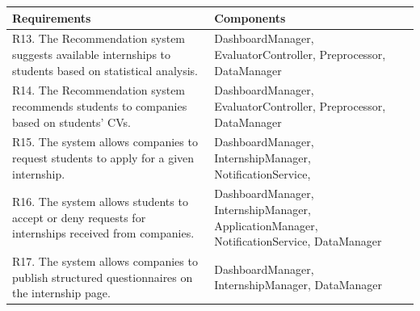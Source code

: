 \documentclass{article}
\begin{document}
\begin{table}[H]
    \centering
    \begin{tabular}{|p{}|p{}|}
        \hline
         \textbf{Requirements} & \textbf{Components} \\
         \hline
         R13. The Recommendation system suggests available internships to students
        based on statistical analysis.\newline
         &
        DashboardManager, \newline
        EvaluatorController,\newline
        Preprocessor,\newline
        DataManager\\

        \hline
         R14. The Recommendation system recommends students to companies
        based on students’ CVs.\newline
         &
        DashboardManager, \newline
        EvaluatorController,\newline
        Preprocessor,\newline
        DataManager\\
        \hline
        R15. The system allows companies to request students to apply for a given
        internship.\newline
         &
        DashboardManager, \newline
        InternshipManager,\newline
        NotificationService,\\
        \hline
       R16. The system allows students to accept or deny requests for internships
        received from companies.\newline
         &
        DashboardManager, \newline
        InternshipManager,\newline
        ApplicationManager, \newline
        NotificationService,\newline
        DataManager\\
        \hline
       R17. The system allows companies to publish structured questionnaires on
        the internship page.\newline
         &
        DashboardManager, \newline
        InternshipManager,\newline
        DataManager\\
        \hline


\end{tabular}
\end{table}
\end{document}

